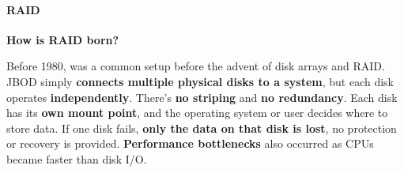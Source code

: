 \newpage

\paragraph{RAID}\label{paragraph: RAID}

\begin{flushleft}
    \textcolor{Green3}{ \textbf{How is RAID born?}}
\end{flushleft}
Before 1980,  was a common setup before the advent of disk arrays and RAID. JBOD simply \textbf{connects multiple physical disks to a system}, but each disk operates \textbf{independently}. There's \textbf{no striping} and \textbf{no redundancy}. Each disk has its \textbf{own mount point}, and the operating system or user decides where to store data. If one disk fails, \textbf{only the data on that disk is lost}, no protection or recovery is provided. \textbf{Performance bottlenecks} also occurred as CPUs became faster than disk I/O.

